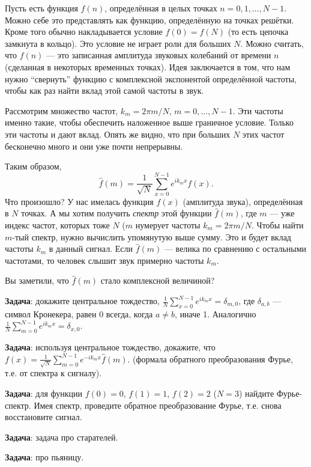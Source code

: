 \documentclass[12pt]{article}
\begin{document}
Пусть есть функция $f(n)$, определённая в целых точках $n = 0, 1, \ldots, N - 1$. Можно себе это представлять как функцию, определённую на точках решётки. Кроме того обычно накладывается условие $f(0) = f(N)$ (то есть цепочка замкнута в кольцо). Это условие не играет роли для больших $N$. Можно считать, что $f(n)$ --- это записанная амплитуда звуковых колебаний от времени $n$ (сделанная в некоторых временных точках). Идея заключается в том, что нам нужно ``свернуть'' функцию с комплексной экспонентой определённой частоты, чтобы как раз найти вклад этой самой частоты в звук. 

Рассмотрим множество частот, $k_m = 2 \pi m / N$, $m = 0, \ldots, N - 1$. Эти частоты именно такие, чтобы обеспечить наложенное выше граничное условие. Только эти частоты и дают вклад. Опять же видно, что при больших $N$ этих частот бесконечно много и они уже почти непрерывны.

Таким образом, $$\hat{f}(m) = \frac{1}{\sqrt{N}} \sum\limits_{x = 0}^{N - 1} e^{i k_m x} f(x).$$ Что произошло? У нас имелась функция $f(x)$ (амплитуда звука), определённая в $N$ точках. А мы хотим получить {\it спектр} этой функции $\hat{f}(m)$, где $m$ --- уже индекс частот, которых тоже $N$ ($m$ нумерует частоты $k_m = 2 \pi m / N$. Чтобы найти $m$-тый спектр, нужно вычислить упомянутую выше сумму. Это и будет вклад частоты $k_m$ в данный сигнал. Если $\hat{f}(m)$ --- велика по сравнению с остальными частотами, то человек слышит звук примерно частоты $k_m$.

Вы заметили, что $\hat{f}(m)$ стало комплексной величиной?

{\bf Задача}: докажите центральное тождество, $\frac{1}{N} \sum\limits_{x = 0}^{N - 1} e^{i k_m x} = \delta_{m, 0}$, где $\delta_{a, b}$ --- символ Кронекера, равен 0 всегда, когда $a \neq b$, иначе 1. Аналогично $\frac{1}{N} \sum \limits_{m = 0}^{N - 1} e^{i k_m x} = \delta_{x, 0}$.

{\bf Задача}: используя центральное тождество, докажите, что $f(x) = \frac{1}{\sqrt{N}} \sum\limits_{m = 0}^{N - 1} e^{-i k_m x} \hat{f}(m).$ (формала обратного преобразования Фурье, т.е. от спектра к сигналу).

{\bf Задача}: для функции $f(0) = 0$, $f(1) = 1$, $f(2) = 2$ ($N = 3$) найдите Фурье-спектр. Имея спектр, проведите обратное преобразование Фурье, т.е. снова восстановите сигнал.

{\bf Задача}: задача про старателей.

{\bf Задача}: про пьяницу.
\end{document}
